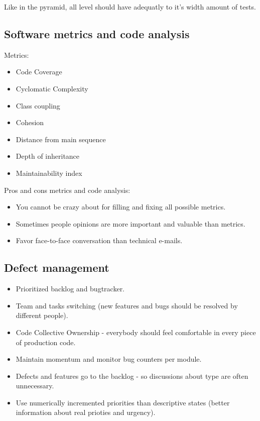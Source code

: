 \documentclass[11pt,a4paper]{article}
\begin{document}
Like in the pyramid, all level should have adequatly to it's width amount of tests.

\subsection{Software metrics and code analysis}

Metrics:
\begin{itemize}
	\item Code Coverage
	\item Cyclomatic Complexity
	\item Class coupling
	\item Cohesion
	\item Distance from main sequence
	\item Depth of inheritance
	\item Maintainability index
\end{itemize}

Pros and cons metrics and code analysis:
\begin{itemize}
	\item You cannot be crazy about for filling and fixing all possible metrics.
	\item Sometimes people opinions are more important and valuable than metrics.
	\item Favor face-to-face conversation than technical e-mails.
\end{itemize}

\subsection{Defect management}
\begin{itemize}
	\item Prioritized backlog and bugtracker.
	\item Team and tasks switching (new features and bugs should be resolved by different people).
	\item Code Collective Ownership - everybody should feel comfortable in every piece of production code.
	\item Maintain momentum and monitor bug counters per module.
	\item Defects and features go to the backlog - so discussions about type are often unnecessary.
	\item Use numerically incremented priorities than descriptive states (better information about real prioties and urgency).
\end{itemize}
\end{document}
